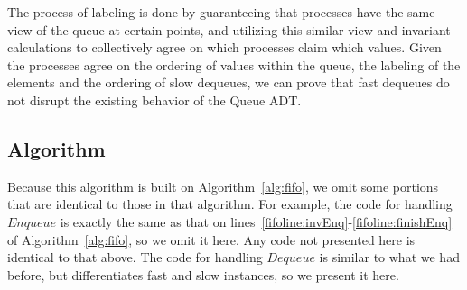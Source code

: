 \documentclass[a4paper,anonymous,USenglish]{lipics-v2021} %
\theoremstyle{definition}
\begin{document}
The process of labeling is done by guaranteeing that processes have the same view of the queue at certain points, and utilizing this similar view and invariant calculations to collectively agree on which processes claim which values. Given the processes agree on the ordering of values within the queue, the labeling of the elements and the ordering of slow dequeues, we can prove that fast dequeues do not disrupt the existing behavior of the Queue ADT. 
\subsection{Algorithm}

Because this algorithm is built on Algorithm~\ref{alg:fifo}, we omit some portions that are identical to those in that algorithm.  For example, the code for handling $Enqueue$ is exactly the same as that on lines~\ref{fifoline:invEnq}-\ref{fifoline:finishEnq} of Algorithm~\ref{alg:fifo}, so we omit it here.  Any code not presented here is identical to that above.  The code for handling $Dequeue$ is similar to what we had before, but differentiates fast and slow instances, so we present it here. 

\end{document}
